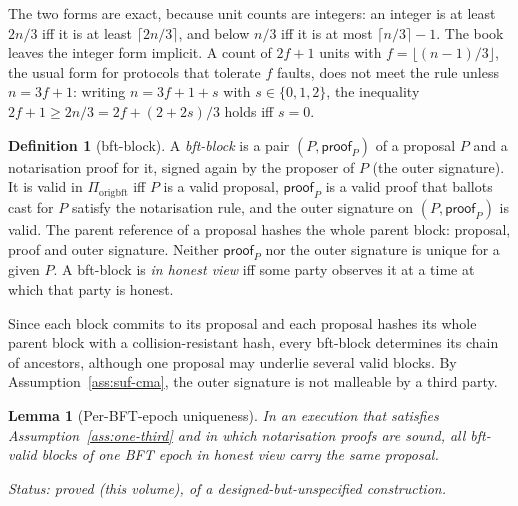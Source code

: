 \documentclass[11pt,a4paper]{article}
\newtheorem{lemma}[theorem]{Lemma}
\theoremstyle{definition}
\newtheorem{definition}[theorem]{Definition}
\newcommand{\Piorigbft}{\Pi_{\mathrm{origbft}}}
\newcommand{\proofsym}{\mathsf{proof}}
\begin{document}
The two forms are exact, because unit counts are integers: an integer is at
least $2n/3$ iff it is at least $\lceil 2n/3 \rceil$, and below $n/3$ iff it
is at most $\lceil n/3 \rceil - 1$. The book leaves the integer form
implicit. A count of $2f + 1$ units with $f = \lfloor (n - 1)/3 \rfloor$,
the usual form for protocols that tolerate $f$ faults, does not meet the
rule unless $n = 3f + 1$: writing $n = 3f + 1 + s$ with $s \in \{0, 1, 2\}$,
the inequality $2f + 1 \ge 2n/3 = 2f + (2 + 2s)/3$ holds iff $s = 0$.

\begin{definition}[bft-block]\label{def:bft-block}
A \emph{bft-block} is a pair $(P, \proofsym_P)$ of a proposal $P$ and a
notarisation proof for it, signed again by the proposer of $P$ (the outer
signature). It is valid in $\Piorigbft$ iff $P$ is a valid proposal,
$\proofsym_P$ is a valid proof that ballots cast for $P$ satisfy the
notarisation rule, and the outer signature on $(P, \proofsym_P)$ is valid.
The parent reference of a proposal hashes the whole parent block: proposal,
proof and outer signature. Neither $\proofsym_P$ nor the outer signature is
unique for a given $P$. A bft-block is \emph{in honest view} iff some party
observes it at a time at which that party is honest.
\end{definition}

Since each block commits to its proposal and each proposal hashes its whole
parent block with a collision-resistant hash, every bft-block determines its
chain of ancestors, although one proposal may underlie several valid blocks.
By Assumption~\ref{ass:suf-cma}, the outer signature is not malleable by a
third party.

\begin{lemma}[Per-BFT-epoch uniqueness]\label{lem:uniqueness}
In an execution that satisfies Assumption~\ref{ass:one-third} and in which
notarisation proofs are sound, all bft-valid blocks of one BFT epoch in
honest view carry the same proposal.

Status: proved (this volume), of a designed-but-unspecified construction.
\end{lemma}
\end{document}

